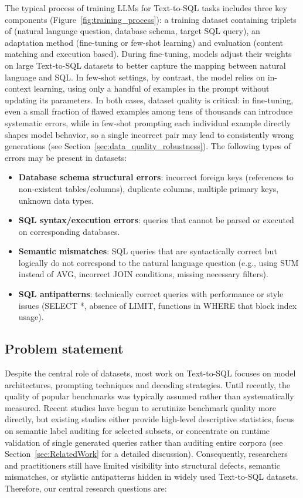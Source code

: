 \documentclass[print]{einformatica}
\begin{document}
The typical process of training LLMs for Text-to-SQL tasks includes three key components (Figure~\ref{fig:training_process}): a training dataset containing triplets of (natural language question, database schema, target SQL query), an adaptation method (fine-tuning or few-shot learning) and evaluation (content matching and execution based). During fine-tuning, models adjust their weights on large Text-to-SQL datasets to better capture the mapping between natural language and SQL. In few-shot settings, by contrast, the model relies on in-context learning, using only a handful of examples in the prompt without updating its parameters. In both cases, dataset quality is critical: in fine-tuning, even a small fraction of flawed examples among tens of thousands can introduce systematic errors, while in few-shot prompting each individual example directly shapes model behavior, so a single incorrect pair may lead to consistently wrong generations (see Section~\ref{sec:data_quality_robustness}). The following types of errors may be present in datasets:

\begin{itemize}
\item \textbf{Database schema structural errors}: incorrect foreign keys (references to non-existent tables/columns), duplicate columns, multiple primary keys, unknown data types.
\item \textbf{SQL syntax/execution errors}: queries that cannot be parsed or executed on corresponding databases.
\item \textbf{Semantic mismatches}: SQL queries that are syntactically correct but logically do not correspond to the natural language question (e.g., using SUM instead of AVG, incorrect JOIN conditions, missing necessary filters).
\item \textbf{SQL antipatterns}: technically correct queries with performance or style issues (SELECT *, absence of LIMIT, functions in WHERE that block index usage).
\end{itemize}

\subsection*{Problem statement}
Despite the central role of datasets, most work on Text-to-SQL focuses on model architectures, prompting techniques and decoding strategies. Until recently, the quality of popular benchmarks was typically assumed rather than systematically measured. Recent studies have begun to scrutinize benchmark quality more directly, but existing studies either provide high-level descriptive statistics, focus on semantic label auditing for selected subsets, or concentrate on runtime validation of single generated queries rather than auditing entire corpora (see Section~\ref{sec:RelatedWork} for a detailed discussion). Consequently, researchers and practitioners still have limited visibility into structural defects, semantic mismatches, or stylistic antipatterns hidden in widely used Text-to-SQL datasets. Therefore, our central research questions are:
\end{document}
